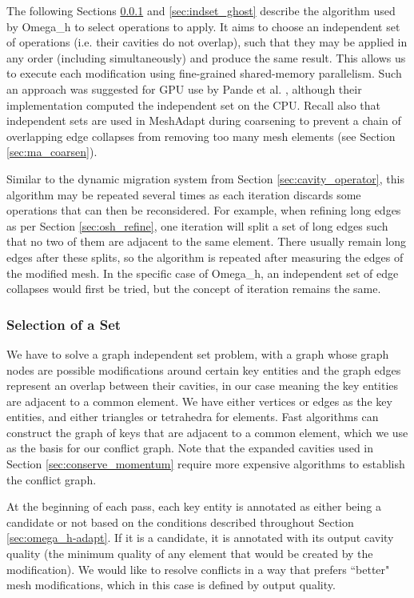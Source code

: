 The following Sections \ref{sec:indset_select} and \ref{sec:indset_ghost}
describe the algorithm used by Omega\_h to select operations to apply.
It aims to choose an independent set of operations (i.e. their cavities
do not overlap), such that they may be applied in
any order (including simultaneously) and produce the same result.
This allows us to execute each modification using fine-grained
shared-memory parallelism.
Such an approach was suggested for GPU use by Pande et al. \cite{pandea2015gpu},
although their implementation computed the independent set on the CPU.
Recall also that independent sets are used in MeshAdapt \cite{de1999parallel}
during coarsening to prevent a chain of overlapping edge collapses
from removing too many mesh elements (see Section \ref{sec:ma_coarsen}).

Similar to the dynamic migration system from Section \ref{sec:cavity_operator},
this algorithm may be repeated several times as each iteration
discards some operations that can then be reconsidered.
For example, when refining long edges as per Section \ref{sec:osh_refine},
one iteration will split a set of long edges such that no two of them
are adjacent to the same element.
There usually remain long edges after these splits, so the algorithm
is repeated after measuring the edges of the modified mesh.
In the specific case of Omega\_h, an independent set of edge collapses
would first be tried, but the concept of iteration remains the same.

\subsubsection{Selection of a Set}
\label{sec:indset_select}

We have to solve a graph independent set problem, with a graph whose
graph nodes are possible modifications around certain key entities
and the graph edges represent an overlap between their cavities,
in our case meaning the key entities are adjacent to a common element.
We have either vertices or edges as the key entities, and either
triangles or tetrahedra for elements.
Fast algorithms can construct the graph of keys that are adjacent
to a common element, which we use as the basis for our conflict graph.
Note that the expanded cavities used in Section \ref{sec:conserve_momentum}
require more expensive algorithms to establish the conflict graph.

At the beginning of each pass, each key entity is annotated as either
being a candidate or not based on the conditions described throughout
Section \ref{sec:omega_h-adapt}.
If it is a candidate, it is annotated with its output cavity quality
(the minimum quality of any element that would be created by the modification).
We would like to resolve conflicts in a way that prefers ``better" mesh
modifications, which in this case is defined by output quality.

